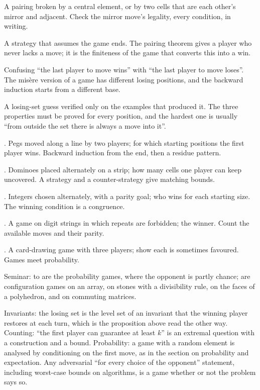 \begin{trap}
A pairing broken by a central element, or by two cells that are each other's mirror and adjacent. Check the mirror move's legality, every condition, in writing.

A strategy that assumes the game ends. The pairing theorem gives a player who never lacks a move; it is the finiteness of the game that converts this into a win.

Confusing ``the last player to move wins'' with ``the last player to move loses''. The misère version of a game has different losing positions, and the backward induction starts from a different base.

A losing-set guess verified only on the examples that produced it. The three properties must be proved for every position, and the hardest one is usually ``from outside the set there is always a move into it''.
\end{trap}

\begin{ladder}
\item {}. Pegs moved along a line by two players; for which starting positions the first player wins. Backward induction from the end, then a residue pattern.
\item {}. Dominoes placed alternately on a strip; how many cells one player can keep uncovered. A strategy and a counter-strategy give matching bounds.
\item {}. Integers chosen alternately, with a parity goal; who wins for each starting size. The winning condition is a congruence.
\item {}. A game on digit strings in which repeats are forbidden; the winner. Count the available moves and their parity.
\item {}. A card-drawing game with three players; show each is sometimes favoured. Games meet probability.
\end{ladder}

Seminar:  to  are the probability games, where the opponent is partly chance;  are configuration games on an array, on stones with a divisibility rule, on the faces of a polyhedron, and on commuting matrices.

\begin{hides}
Invariants: the losing set is the level set of an invariant that the winning player restores at each turn, which is the proposition above read the other way. Counting: ``the first player can guarantee at least $k$'' is an extremal question with a construction and a bound. Probability: a game with a random element is analysed by conditioning on the first move, as in the section on probability and expectation. Any adversarial ``for every choice of the opponent'' statement, including worst-case bounds on algorithms, is a game whether or not the problem says so.
\end{hides}

